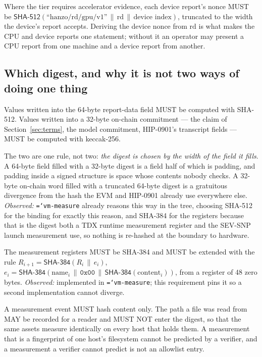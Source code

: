 \documentclass[11pt,a4paper]{article}
\newcommand{\code}[1]{\texttt{\hyphenchar\font=`\-\relax #1}}
\newcommand{\req}[1]{\textbf{#1}}
\begin{document}
\begin{description}[leftmargin=1.6em]
\item[\req{B5}] Where the tier requires accelerator evidence, each device report's
nonce MUST be
$\mathsf{SHA\text{-}512}(\text{``hanzo/rd/gpu/v1''} \,\|\, \mathrm{rd} \,\|\, \text{device index})$,
truncated to the width the device's report accepts. Deriving the device nonce from
$\mathrm{rd}$ is what makes the CPU and device reports one statement; without it an
operator may present a CPU report from one machine and a device report from
another.
\end{description}

\subsection{Which digest, and why it is not two ways of doing one thing}

\begin{description}[leftmargin=1.6em]
\item[\req{B6}] Values written into the 64-byte report-data field MUST be computed
with SHA-512. Values written into a 32-byte on-chain commitment --- the claim of
Section~\ref{sec:terms}, the model commitment, HIP-0901's transcript fields --- MUST
be computed with keccak-256.
\end{description}

The two are one rule, not two: \emph{the digest is chosen by the width of the field
it fills}. A 64-byte field filled with a 32-byte digest is a field half of which is
padding, and padding inside a signed structure is space whose contents nobody
checks. A 32-byte on-chain word filled with a truncated 64-byte digest is a
gratuitous divergence from the hash the EVM and HIP-0901 already use everywhere
else. \emph{Observed:} \code{vm-measure} already reasons this way in the tree,
choosing SHA-512 for the binding for exactly this reason, and SHA-384 for the
registers because that is the digest both a TDX runtime measurement register and
the SEV-SNP launch measurement use, so nothing is re-hashed at the boundary to
hardware.

\begin{description}[leftmargin=1.6em]
\item[\req{B7}] The measurement registers MUST be SHA-384 and MUST be extended with
the rule
$R_{i+1} = \mathsf{SHA\text{-}384}(R_i \,\|\, e_i)$, $e_i = \mathsf{SHA\text{-}384}(\text{name}_i \,\|\, \texttt{0x00} \,\|\, \mathsf{SHA\text{-}384}(\text{content}_i))$,
from a register of 48 zero bytes. \emph{Observed:} implemented in
\code{vm-measure}; this requirement pins it so a second implementation cannot
diverge.

\item[\req{B8}] A measurement event MUST hash content only. The path a file was
read from MAY be recorded for a reader and MUST NOT enter the digest, so that the
same assets measure identically on every host that holds them. A measurement that
is a fingerprint of one host's filesystem cannot be predicted by a verifier, and a
measurement a verifier cannot predict is not an allowlist entry.
\end{description}
\end{document}
